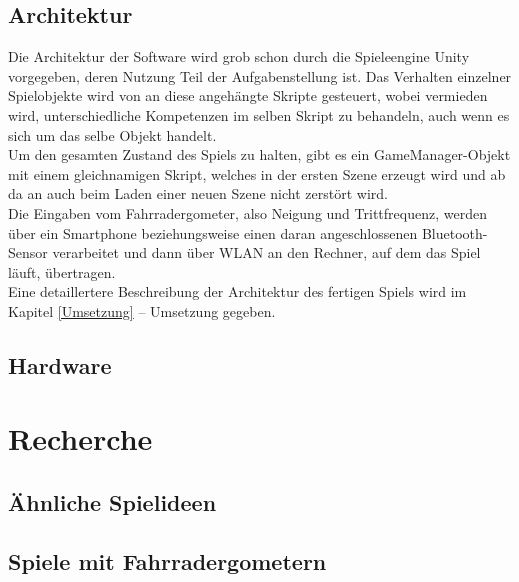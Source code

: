 \section{Architektur}
Die Architektur der Software wird grob schon durch die Spieleengine Unity vorgegeben, deren Nutzung Teil der Aufgabenstellung ist. Das Verhalten einzelner Spielobjekte wird von an diese angehängte Skripte gesteuert, wobei vermieden wird, unterschiedliche Kompetenzen im selben Skript zu behandeln, auch wenn es sich um das selbe Objekt handelt.\\
Um den gesamten Zustand des Spiels zu halten, gibt es ein GameManager-Objekt mit einem gleichnamigen Skript, welches in der ersten Szene erzeugt wird und ab da an auch beim Laden einer neuen Szene nicht zerstört wird.\\
Die Eingaben vom Fahrradergometer, also Neigung und Trittfrequenz, werden über ein Smartphone beziehungsweise einen daran angeschlossenen Bluetooth-Sensor verarbeitet und dann über WLAN an den Rechner, auf dem das Spiel läuft, übertragen.\\
Eine detaillertere Beschreibung der Architektur des fertigen Spiels wird im Kapitel \ref{Umsetzung} -- Umsetzung gegeben.


\section{Hardware}


 
\chapter{Recherche}
\section{Ähnliche Spielideen}


\section{Spiele mit Fahrradergometern}
\label{StateOfTheArt}











